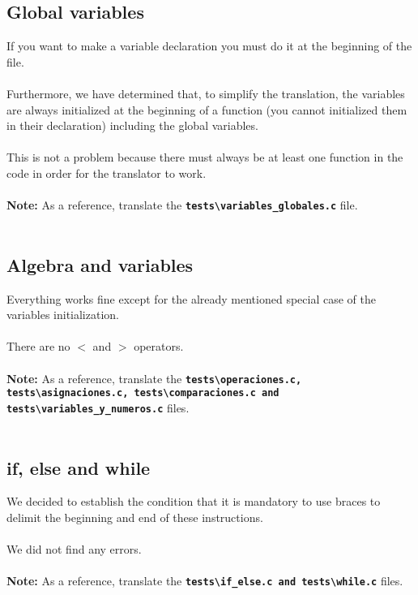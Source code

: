\documentclass[]{article}
\begin{document}
        \subsection{Global variables}
        If you want to make a variable declaration you must do it at the beginning of the file.\\\\Furthermore, we have determined that, to simplify the translation, the variables are always initialized at the beginning of a function (you cannot initialized them in their declaration) including the global variables.\\\\This is not a problem because there must always be at least one function in the code in order for the translator to work.\\\\
        \textbf{Note:} As a reference, translate the \texttt{\textbf{tests\textbackslash variables\_{globales.c}}} file. \\\\

        \subsection{Algebra and variables}
        Everything works fine except for the already mentioned special case of the variables initialization.\\\\There are no $<$ and $>$ operators. \\\\

        \textbf{Note:} As a reference, translate the \texttt{\textbf{tests\textbackslash operaciones.c, tests\textbackslash asignaciones.c, tests\textbackslash comparaciones.c and tests\textbackslash variables\_{y\_{numeros.c}}}} files. \\\\

        \subsection{if, else and while}
        We decided to establish the condition that it is mandatory to use braces to delimit the beginning and end of these instructions. \\\\We did not find any errors. \\\\
        \textbf{Note:} As a reference, translate the \texttt{\textbf{tests\textbackslash if\_{else.c} and tests\textbackslash while.c}} files. \\\\
\end{document}
